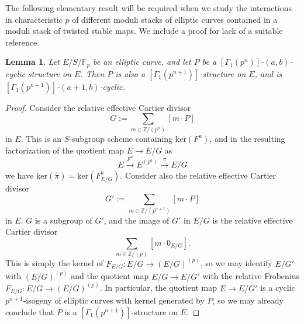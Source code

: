 \documentclass[11pt]{amsart}
\newtheorem{lemma}[subsection]{Lemma}
\theoremstyle{definition}
\begin{document}
The following elementary result will be required when we study the interactions in characteristic $p$ of different moduli stacks of elliptic curves contained in a moduli stack of twisted stable maps. We include a proof for lack of a suitable reference.

\begin{lemma}\label{gamma1comps}
Let $E/S/\mathbb{F}_p$ be an elliptic curve, and let $P$ be a $[\Gamma_1(p^n)]$-$(a,b)$-cyclic structure on $E$. Then $P$ is also a $[\Gamma_1(p^{n+1})]$-structure on $E$, and is $[\Gamma_1(p^{n+1})]$-$(a+1,b)$-cyclic.
\end{lemma}
\begin{proof}
Consider the relative effective Cartier divisor 
\begin{displaymath}
G := \sum_{m \in \mathbb{Z}/(p^n)} [m\cdot P]
\end{displaymath}
in $E$. This is an $S$-subgroup scheme containing $\mathrm{ker}(F^a)$, and in the resulting factorization of the quotient map $E \rightarrow E/G$ as 
\begin{displaymath}
E \stackrel{F^a}{\rightarrow} E^{(p^a)} \stackrel{\pi}{\rightarrow} E/G
\end{displaymath}
we have $\mathrm{ker}(\widehat{\pi}) = \mathrm{ker}(F^b_{E/G})$. Consider also the relative effective Cartier divisor 
\begin{displaymath}
G' := \sum_{m \in \mathbb{Z}/(p^{n+1})} [m\cdot P]
\end{displaymath}
in $E$. $G$ is a subgroup of $G'$, and the image of $G'$ in $E/G$ is the relative effective Cartier divisor 
\begin{displaymath}
\sum_{m \in \mathbb{Z}/(p)} [m \cdot 0_{E/G}].
\end{displaymath}
This is simply the kernel of $F_{E/G}: E/G \rightarrow (E/G)^{(p)}$, so we may identify $E/G'$ with $(E/G)^{(p)}$ and the quotient map $E/G \rightarrow E/G'$ with the relative Frobenius $F_{E/G}: E/G \rightarrow (E/G)^{(p)}$. In particular, the quotient map $E \rightarrow E/G'$ is a cyclic $p^{n+1}$-isogeny of elliptic curves with kernel generated by $P$, so we may already conclude that $P$ is a $[\Gamma_1(p^{n+1})]$-structure on $E$.


\end{proof}
\end{document}
